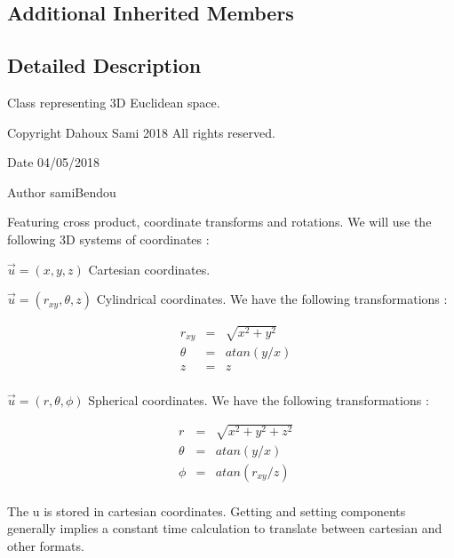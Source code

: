 \subsection*{Additional Inherited Members}


\subsection{Detailed Description}
Class representing 3D Euclidean space. 

\begin{DoxyCopyright}{Copyright}
Dahoux Sami 2018 All rights reserved. 
\end{DoxyCopyright}
\begin{DoxyDate}{Date}
04/05/2018 
\end{DoxyDate}
\begin{DoxyAuthor}{Author}
sami\+Bendou
\end{DoxyAuthor}
Featuring cross product, coordinate transforms and rotations. We will use the following 3D systems of coordinates \+:


\begin{DoxyItemize}
\item $ \vec{u} = (x, y, z) $ Cartesian coordinates.
\item $ \vec{u} = (r_{xy}, \theta, z) $ Cylindrical coordinates. We have the following transformations \+:
\end{DoxyItemize}

\[ \begin{align*} & r_{xy} & = & \sqrt{x^2 + y^2} \\ & \theta & = & atan(y / x) \\ & z & = & z \\ \end{align*} \]


\begin{DoxyItemize}
\item $ \vec{u} = (r, \theta, \phi) $ Spherical coordinates. We have the following transformations \+:
\end{DoxyItemize}

\[ \begin{align*} & r & = & \sqrt{x^2 + y^2 + z^2} \\ & \theta & = & atan(y / x) \\ & \phi & = & atan(r_{xy} / z) \\ \end{align*} \]

The u is stored in cartesian coordinates. Getting and setting components generally implies a constant time calculation to translate between cartesian and other formats.

